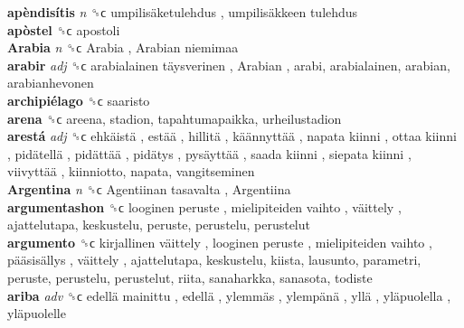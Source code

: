 \textbf{apèndisítis} \emph{n}  ␝ϲ   umpilisäketulehdus ,  umpilisäkkeen tulehdus   \\
\textbf{apòstel} ␝ϲ  apostoli  \\
\textbf{Arabia} \emph{n}  ␝ϲ   Arabia ,  Arabian niemimaa   \\
\textbf{arabir} \emph{adj}  ␝ϲ   arabialainen täysverinen ,  Arabian , arabi, arabialainen, arabian, arabianhevonen  \\
\textbf{archipiélago} ␝ϲ  saaristo  \\
\textbf{arena} ␝ϲ  areena, stadion, tapahtumapaikka, urheilustadion  \\
\textbf{arestá} \emph{adj}  ␝ϲ   ehkäistä ,  estää ,  hillitä ,  käännyttää ,  napata kiinni ,  ottaa kiinni ,  pidätellä ,  pidättää ,  pidätys ,  pysäyttää ,  saada kiinni ,  siepata kiinni ,  viivyttää , kiinniotto, napata, vangitseminen  \\
\textbf{Argentina} \emph{n}  ␝ϲ   Agentiinan tasavalta ,  Argentiina   \\
\textbf{argumentashon} ␝ϲ   looginen peruste ,  mielipiteiden vaihto ,  väittely , ajattelutapa, keskustelu, peruste, perustelu, perustelut  \\
\textbf{argumento} ␝ϲ   kirjallinen väittely ,  looginen peruste ,  mielipiteiden vaihto ,  pääsisällys ,  väittely , ajattelutapa, keskustelu, kiista, lausunto, parametri, peruste, perustelu, perustelut, riita, sanaharkka, sanasota, todiste  \\
\textbf{ariba} \emph{adv}  ␝ϲ   edellä mainittu ,  edellä ,  ylemmäs ,  ylempänä ,  yllä ,  yläpuolella ,  yläpuolelle   \\
